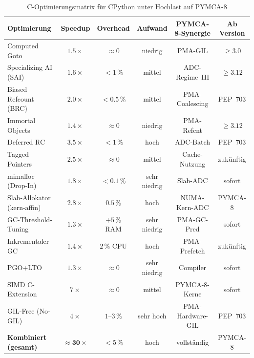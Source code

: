 ﻿\documentclass[a4paper,12pt]{scrreprt}
\theoremstyle{definition}
\begin{document}
	\begin{table}
		\centering
		\caption{C-Optimierungsmatrix für CPython unter Hochlast auf PYMCA-8}
		\label{tab:optimization_matrix}
		\renewcommand{\arraystretch}{1.35}
		\begin{tabular}{p{3.8cm}ccccc}
			\toprule
			\textbf{Optimierung} & \textbf{Speedup} & \textbf{Overhead} &
			\textbf{Aufwand} & \textbf{PYMCA-8-Synergie} &
			\textbf{Ab Version} \\
			\midrule
			Computed Goto         & $1.5\times$  & $\approx 0$  & niedrig  &
			PMA-GIL & $\ge 3.0$ \\
			Specializing AI (SAI) & $1.6\times$  & $< 1\,\%$    & mittel   &
			ADC-Regime~III & $\ge 3.12$ \\
			Biased Refcount (BRC) & $2.0\times$  & $< 0.5\,\%$  & mittel   &
			PMA-Coalescing & PEP~703 \\
			Immortal Objects      & $1.4\times$  & $\approx 0$  & niedrig  &
			PMA-Refcnt & $\ge 3.12$ \\
			Deferred RC           & $3.5\times$  & $< 1\,\%$    & hoch     &
			ADC-Batch & PEP~703 \\
			Tagged Pointers       & $2.5\times$  & $\approx 0$  & mittel   &
			Cache-Nutzung & zukünftig \\
			mimalloc (Drop-In)    & $1.8\times$  & $< 0.1\,\%$  & sehr niedrig &
			Slab-ADC & sofort \\
			Slab-Allokator (kern-affin) & $2.8\times$ & $0.5\,\%$ & hoch   &
			NUMA-Kern-ADC & PYMCA-8 \\
			GC-Threshold-Tuning   & $1.3\times$  & $+5\,\%$ RAM & sehr niedrig &
			PMA-GC-Pred & sofort \\
			Inkrementaler GC      & $1.4\times$  & $2\,\%$ CPU  & hoch     &
			PMA-Prefetch & zukünftig \\
			PGO+LTO               & $1.3\times$  & $\approx 0$  & sehr niedrig &
			Compiler & sofort \\
			SIMD C-Extension      & $7\times$    & $\approx 0$  & mittel   &
			PYMCA-8-Kerne & sofort \\
			GIL-Free (No-GIL)     & $4\times$    & $1\text{--}3\,\%$ & sehr hoch &
			PMA-Hardware-GIL & PEP~703 \\
			\midrule
			\textbf{Kombiniert (gesamt)} & $\mathbf{\approx 30\times}$ &
			$<5\,\%$ & hoch & vollständig & PYMCA-8 \\
			\bottomrule
		\end{tabular}
	\end{table}
	
\end{document}
